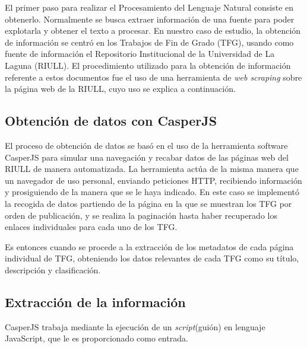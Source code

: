 
El primer paso para realizar el Procesamiento del Lenguaje Natural consiste en obtenerlo. Normalmente se busca extraer información de una fuente para poder explotarla y obtener el texto a procesar.
%
En nuestro caso de estudio, la obtención de información se centró en los Trabajos de Fin de Grado (TFG), usando como fuente de información el Repositorio Institucional de la Universidad de La Laguna (RIULL).
%
El procedimiento utilizado para la obtención de información referente a estos documentos fue el uso de una herramienta de \textit{web scraping} sobre la página web de la RIULL, cuyo uso se explica a continuación.

\subsection{Obtención de datos con CasperJS}



El proceso de obtención de datos se basó en el uso de la herramienta software CasperJS \cite{casperjs} para simular una navegación y recabar datos de las páginas web del RIULL de manera automatizada.
%
La herramienta actúa de la misma manera que un navegador de uso personal, enviando peticiones HTTP, recibiendo información y prosiguiendo de la manera que se le haya indicado.
En este caso se implementó la recogida de datos partiendo de la página en la que se muestran los TFG por orden de publicación, y se realiza la paginación hasta haber recuperado los enlaces individuales para cada uno de los TFG.

Es entonces cuando se procede a la extracción de los metadatos de cada página individual de TFG, obteniendo los datos relevantes de cada TFG como su título, descripción y clasificación.

\subsection{Extracción de la información}

CasperJS trabaja mediante la ejecución de un \textit{script}(guión) en lenguaje JavaScript, que le es proporcionado como entrada.
